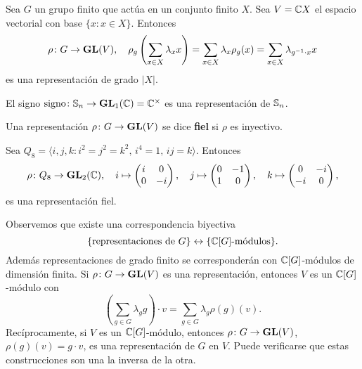 \begin{example}
  Sea $G$ un grupo finito que actúa en un conjunto finito $X$. 
  Sea $V=\mathbb{C} X$ el espacio vectorial con base $\{x:x\in
  X\}$. Entonces
  \[
	\rho\colon G\to\mathbf{GL}(V),\quad
	\rho_g\left(\sum_{x\in X}\lambda_x x\right)
	=\sum_{x\in X}\lambda_x\rho_g(x)
	=\sum_{x\in X}\lambda_{g^{-1}\cdot x}x
  \]
  es una representación de grado $|X|$.
\end{example}

\begin{example}
El signo $\operatorname{signo}\colon\mathbb{S}_n\to\mathbf{GL}_1(\mathbb{C})=\mathbb{C}^{\times}$ es una representación de $\mathbb{S}_n$.
\end{example}

Una representación $\rho\colon G\to\mathbf{GL}(V)$ se dice \textbf{fiel} si $\rho$
es inyectivo.

\begin{example}
	Sea $Q_8=\langle i,j,k:i^2=j^2=k^2,\,i^4=1,\,ij=k\rangle$. Entonces 
	\[
		\rho\colon Q_8\to\mathbf{GL}_2(\mathbb{C}),\quad
		i\mapsto\begin{pmatrix}
			i & 0\\
			0 & -i
		\end{pmatrix},
		\quad
		j\mapsto\begin{pmatrix}
			0 & -1\\
			1 & 0
		\end{pmatrix},
		\quad
		k\mapsto\begin{pmatrix}
			0 & -i\\
			-i & 0
		\end{pmatrix},
	\]
	es una representación fiel. 
\end{example}

Observemos que existe una correspondencia biyectiva 
\[
\{\text{representaciones de $G$}\}\leftrightarrow\{\text{$\mathbb{C}[G]$-módulos}\}.
\]
Además representaciones de grado finito se corresponderán con $\mathbb{C}[G]$-módulos de dimensión finita. 
Si $\rho\colon G\to\mathbf{GL}(V)$ es una representación, entonces 
$V$ es un $\mathbb{C}[G]$-módulo con
\[
\left(\sum_{g\in G}\lambda_gg\right)\cdot v=\sum_{g\in G}\lambda_g\rho(g)(v).
\]
Recíprocamente, si $V$ es un $\mathbb{C}[G]$-módulo, entonces $\rho\colon G\to\mathbf{GL}(V)$, 
$\rho(g)(v)=g\cdot v$, es una representación de $G$ en $V$. Puede verificarse que estas
construcciones son una la inversa de la otra.  

%


